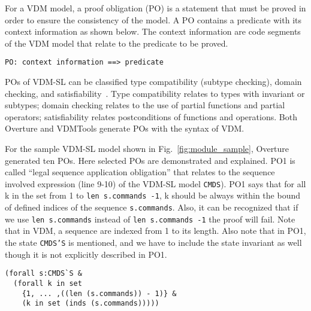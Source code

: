 
For a VDM model, a proof obligation (PO) is a statement that must be proved in order to ensure the consistency of the model. A PO contains a predicate with its context information as shown below. The context information are code segments of the VDM model that relate to the predicate to be proved.

\begin{mdframed}[roundcorner=5pt]
\begin{Verbatim}[fontsize=\small]
PO: context information ==> predicate
\end{Verbatim}
\end{mdframed}

POs of VDM-SL can be classified type compatibility (subtype checking), domain checking, and satisfiability~\cite{AL:97:POGV,Vermolen:2010:PCV:1774088.1774608}. Type compatibility relates to types with invariant or subtypes; domain checking relates to the use of partial functions and partial operators; satisfiability relates postconditions of functions and operations. Both Overture and VDMTools generate POs with the syntax of VDM.

For the sample VDM-SL model shown in Fig.~\ref{fig:module_sample}, Overture generated ten POs. Here selected POs are demonstrated and explained. PO1 is called ``legal sequence application obligation'' that relates to the sequence involved expression (line 9-10) of the VDM-SL model {\tt CMDS}). PO1 says that for all k in the set from 1 to {\tt len s.commands -1}, k should be always within the bound of defined indices of the sequence {\tt s.commands}. Also, it can be recognized that if we use {\tt len s.commands} instead of {\tt len s.commands -1} the proof will fail. Note that in VDM, a sequence are indexed from 1 to its length. Also note that in PO1, the state {\tt CMDS'S} is mentioned, and we have to include the state invariant as well though it is not explicitly described in PO1.

\begin{mdframed}[roundcorner=5pt]
\begin{Verbatim}[fontsize=\small]
(forall s:CMDS`S & 
  (forall k in set 
    {1, ... ,((len (s.commands)) - 1)} & 
    (k in set (inds (s.commands)))))
\end{Verbatim}
\end{mdframed}

